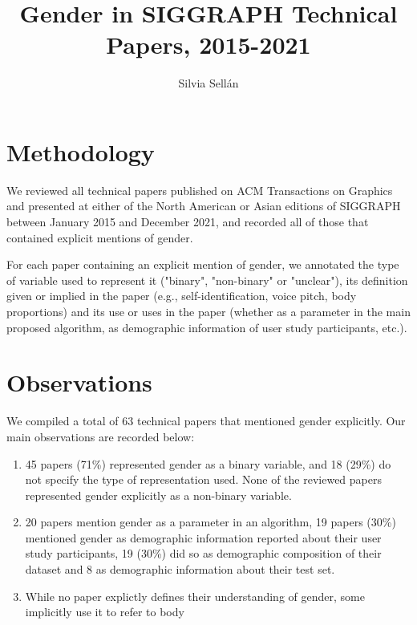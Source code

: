 \documentclass[acmtog,nonacm,review,balance=false]{acmart}
\begin{document}
\title{Gender in SIGGRAPH Technical Papers, 2015-2021}

\author{Silvia Sell\'{a}n} 

\begin{abstract}
\end{abstract}


\maketitle

\section{Methodology}

We reviewed all technical papers published on ACM Transactions on Graphics and
presented at either of the North American or Asian editions of SIGGRAPH between
January 2015 and December 2021, and recorded all of those that contained
explicit mentions of gender.

For each paper containing an explicit mention of gender, we annotated the type
of variable used to represent it ("binary", "non-binary" or "unclear"), its
definition given or implied in the paper (e.g., self-identification, voice
pitch, body proportions) and its use or uses in the paper (whether as a
parameter in the main proposed algorithm, as demographic information of user
study participants, etc.).

\section{Observations}

We compiled a total of 63 technical papers that mentioned gender explicitly. Our
main observations are recorded below:
\begin{enumerate}
    \item 45 papers (71\%) represented gender as a binary variable, and 18
    (29\%) do not specify the type of representation used. None of the reviewed
    papers represented gender explicitly as a non-binary variable.
    \item 20 papers mention gender as a parameter in an algorithm, 19 papers (30\%) mentioned gender as demographic information reported
    about their user study participants, 19 (30\%) did so as demographic composition of their dataset and 8 as demographic information about their test set.
    \item While no paper explictly defines their understanding of gender, some implicitly use it to refer to body 
\end{enumerate}
\end{document}
